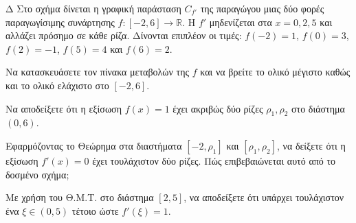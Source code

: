 
\begin{thema}{Δ}
Στο σχήμα δίνεται η γραφική παράσταση $C_{f'}$ της παραγώγου μιας δύο φορές παραγωγίσιμης συνάρτησης $f:[-2, 6]\to\mathbb{R}$. Η $f'$ μηδενίζεται στα $x = 0, 2, 5$ και αλλάζει πρόσημο σε κάθε ρίζα. Δίνονται επιπλέον οι τιμές: $f(-2) = 1$, $f(0) = 3$, $f(2) = -1$, $f(5) = 4$ και $f(6) = 2$.

\begin{center}
\end{center}

\begin{erwthma}
  \item Να κατασκευάσετε τον πίνακα μεταβολών της $f$ και να βρείτε το ολικό μέγιστο καθώς και το ολικό ελάχιστο στο $[-2, 6]$.
  \item Να αποδείξετε ότι η εξίσωση $f(x) = 1$ έχει ακριβώς δύο ρίζες $\rho_1, \rho_2$ στο διάστημα $(0, 6)$.
  \item Εφαρμόζοντας το Θεώρημα  στα διαστήματα $[-2, \rho_1]$ και $[\rho_1, \rho_2]$, να δείξετε ότι η εξίσωση $f'(x) = 0$ έχει τουλάχιστον δύο ρίζες. Πώς επιβεβαιώνεται αυτό από το δοσμένο σχήμα;
  \item Με χρήση του Θ.Μ.Τ. στο διάστημα $[2, 5]$, να αποδείξετε ότι υπάρχει τουλάχιστον ένα $\xi \in (0, 5)$ τέτοιο ώστε $f'(\xi) = 1$.
\end{erwthma}
\end{thema}

